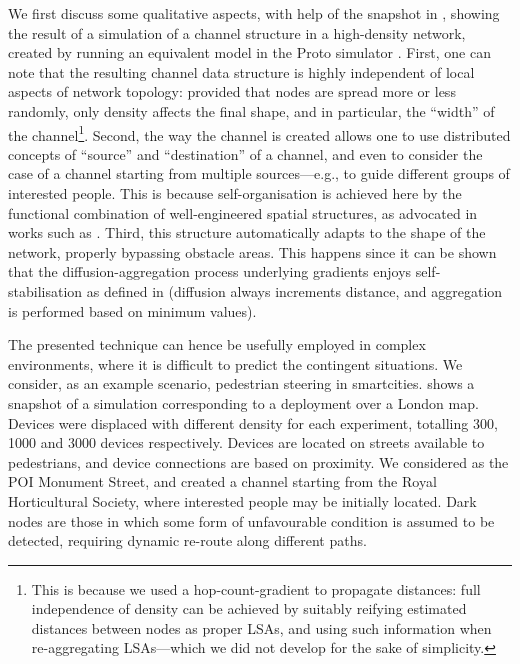 \documentclass[12pt,a4paper,twoside,openright]{book}
\begin{document}
We first discuss some qualitative aspects, with help of the snapshot in , showing the result of a simulation of a channel structure in a high-density network, created by running an equivalent model in the Proto simulator \cite{proto}.
%
First, one can note that the resulting channel data structure is highly independent of local aspects of network topology: provided that nodes are spread more or less randomly, only density affects the final shape, and in particular, the ``width'' of the channel\footnote{This is because we used a hop-count-gradient to propagate distances: full independence of density can be achieved by suitably reifying estimated distances between nodes as proper LSAs, and using such information when re-aggregating LSAs---which we did not develop for the sake of simplicity.}.
%
Second, the way the channel is created allows one to use distributed concepts of ``source'' and ``destination'' of a channel, and even to consider the case of a channel starting from multiple sources---e.g., to guide different groups of interested people.
%
This is because self-organisation is achieved here by the functional combination of well-engineered spatial structures, as advocated in works such as \cite{SpatialIGI2013}.
%
Third, this structure automatically adapts to the shape of the network, properly bypassing obstacle areas.
%
This happens since it can be shown that the diffusion-aggregation process underlying gradients enjoys self-stabilisation as defined in \cite{VD-COORD2014-LNCS2014} (diffusion always increments distance, and aggregation is performed based on minimum values).

The presented technique can hence be usefully employed in complex environments, where it is difficult to predict the contingent situations.
%
We consider, as an example scenario, pedestrian steering in smartcities.
%
 shows a snapshot of a simulation corresponding to a deployment over a London map.
%
Devices were displaced with different density for each experiment, totalling 300, 1000 and 3000 devices respectively.
%
Devices are located on streets available to pedestrians, and device connections are based on proximity.
%
We considered as the POI Monument Street, and created a channel starting from the Royal Horticultural Society, where interested people may be initially located.
%
Dark nodes are those in which some form of unfavourable condition is assumed to be detected, requiring dynamic re-route along different paths.
\end{document}
